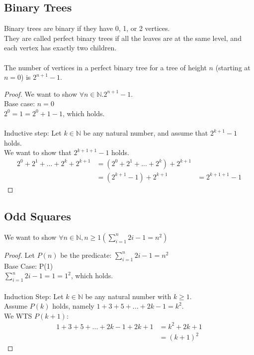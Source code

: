 \documentclass{article}
\begin{document}
\subsection{Binary Trees}
Binary trees are binary if they have 0, 1, or 2 vertices.\\
They are called perfect binary trees if all the leaves are at the same level, and each vertex has exactly two children.\\
\\
The number of vertices in a perfect binary tree for a tree of height $n$ (starting at $n = 0$) is $2^{n + 1} - 1$.
\begin{proof}
We want to show $\forall n \in \mathbb{N}.2^{n + 1} - 1$.\\
Base case: $n = 0$\\
$2^0 = 1 = 2^0 + 1 - 1$, which holds.\\
\\
Inductive step: Let $ k \in \mathbb{N}$ be any natural number, and assume that $2^{k + 1} - 1$ holds.\\
We want to show that $2^{k + 1 + 1} - 1$ holds.
\begin{align*}
    2^0 + 2^1 + ... + 2^k + 2^{k + 1} & = (2^0 + 2^1 + ... + 2^k) + 2^{k + 1}\\
    & = (2^{k + 1} - 1) + 2^{k + 1}
    & = 2^{k + 1 + 1} - 1
\end{align*}
\end{proof}
\subsection{Odd Squares}
We want to show $\forall n \in \mathbb{N}, n \geq 1 ( \sum^{n}_{i = 1} 2i - 1 = n^2)$
\begin{proof}
Let $P(n)$ be the predicate: $\sum^{n}_{i = 1} 2i - 1 = n^2$\\
Base Case: P(1)\\
$\sum^{n}_{i = 1} 2i - 1 = 1 = 1^2$, which holds.\\
\\
Induction Step: Let $k \in \mathbb{N}$ be any natural number with $k \geq 1$.\\
Assume $P(k)$ holds, namely $1 + 3 + 5 + ... + 2k - 1 = k^2$.\\
We WTS $P(k + 1)$:
\begin{align*}
    1 + 3 + 5 + ... + 2k - 1 + 2k + 1 & = k^2 + 2k + 1\\
    & = (k + 1)^2
\end{align*}
\end{proof}
\end{document}
